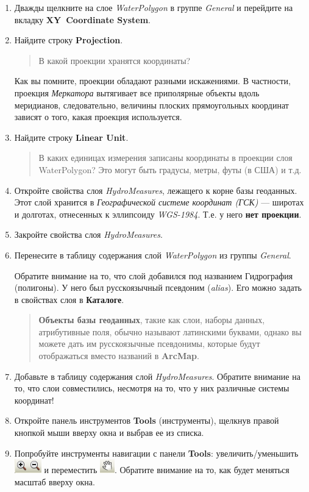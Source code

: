 \documentclass[12pt,]{book}
\begin{document}
\begin{enumerate}
\def\labelenumi{\arabic{enumi}.}
\item
  Дважды щелкните на слое \emph{WaterPolygon} в группе \emph{General} и перейдите на вкладку \textbf{XY~Coordinate System}.
\item
  Найдите строку \textbf{Projection}.

  \begin{quote}
  В какой проекции хранятся координаты?
  \end{quote}

  Как вы помните, проекции обладают разными искажениями. В частности, проекция \emph{Меркатора} вытягивает все приполярные объекты вдоль меридианов, следовательно, величины плоских прямоугольных координат зависят о того, какая проекция используется.
\item
  Найдите строку \textbf{Linear Unit}.

  \begin{quote}
  В каких единицах измерения записаны координаты в проекции слоя WaterPolygon? Это могут быть градусы, метры, футы (в США) и т.д.
  \end{quote}
\item
  Откройте свойства слоя \emph{HydroMeasures}, лежащего к корне базы геоданных. Этот слой хранится в \emph{Географической системе координат (ГСК)} --- широтах и долготах, отнесенных к эллипсоиду \emph{WGS-1984}. Т.е. у него \textbf{нет проекции}.
\item
  Закройте свойства слоя \emph{HydroMeasures}.
\item
  Перенесите в таблицу содержания слой \emph{WaterPolygon} из группы \emph{General}.

  Обратите внимание на то, что слой добавился под названием Гидрография (полигоны). У него был русскоязычный псевдоним (\emph{alias}). Его можно задать в свойствах слоя в \textbf{Каталоге}.

  \begin{quote}
  \textbf{Объекты базы геоданных}, такие как слои, наборы данных, атрибутивные поля, обычно называют латинскими буквами, однако вы можете дать им русскоязычные псевдонимы, которые будут отображаться вместо названий в \textbf{ArcMap}.
  \end{quote}
\item
  Добавьте в таблицу содержания слой \emph{HydroMeasures}. Обратите внимание на то, что слои совместились, несмотря на то, что у них различные системы координат!
\item
  Откройте панель инструментов \textbf{Tools} (инструменты), щелкнув правой кнопкой мыши вверху окна и выбрав ее из списка.
\item
  Попробуйте инструменты навигации с панели \textbf{Tools}: увеличить/уменьшить \includegraphics{images/Ex01/image12.png} и переместить \includegraphics{images/Ex01/image13.png}. Обратите внимание на то, как будет меняться масштаб вверху окна.


\end{enumerate}
\end{document}
